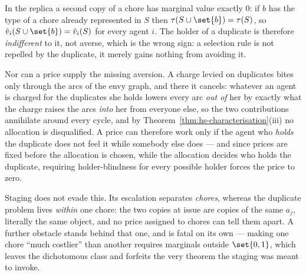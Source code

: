 \begin{example}
\label{main:ex-pricing}
In the replica a second copy of a chore has marginal value exactly $0$: if $b$
has the type of a chore already represented in $S$ then
$\tau(S \cup \set{b}) = \tau(S)$, so $\hat{v}_i(S \cup \set{b}) = \hat{v}_i(S)$
for every agent $i$. The holder of a duplicate is therefore \emph{indifferent} to
it, not averse, which is the wrong sign: a selection rule is not repelled by the
duplicate, it merely gains nothing from avoiding it.

Nor can a price supply the missing aversion. A charge levied on duplicates bites
only through the arcs of the envy graph, and there it cancels: whatever an agent
is charged for the duplicates she holds lowers every arc \emph{out of} her by
exactly what the charge raises the arcs \emph{into} her from everyone else, so
the two contributions annihilate around every cycle, and by
Theorem~\ref{thm:hs-characterisation}(iii) no allocation is disqualified. A price
can therefore work only if the agent who \emph{holds} the duplicate does not feel
it while somebody else does --- and since prices are fixed before the allocation
is chosen, while the allocation decides who holds the duplicate, requiring
holder-blindness for every possible holder forces the price to zero.
\end{example}

Staging does not evade this. Its escalation separates \emph{chores}, whereas the
duplicate problem lives \emph{within} one chore: the two copies at issue are
copies of the same $a_j$, literally the same object, and no price assigned to
chores can tell them apart. A further obstacle stands behind that one, and is
fatal on its own --- making one chore ``much costlier'' than another requires
marginals outside $\set{0,1}$, which leaves the dichotomous class and forfeits
the very theorem the staging was meant to invoke.

